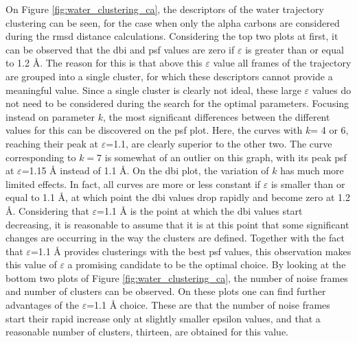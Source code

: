 On Figure \ref{fig:water_clustering_ca}, the descriptors of the water trajectory clustering can be seen, for the case when only the alpha carbons are considered during the \gls{rmsd} distance calculations.
Considering the top two plots at first, it can be observed that the \gls{dbi} and \gls{psf} values are zero if $\varepsilon$ is greater than or equal to 1.2 \AA{}.
The reason for this is that above this $\varepsilon$ value all frames of the trajectory are grouped into a single cluster, for which these descriptors cannot provide a meaningful value.
Since a single cluster is clearly not ideal, these large $\varepsilon$ values do not need to be considered during the search for the optimal parameters.
Focusing instead on parameter $k$, the most significant differences between the different values for this can be discovered on the \gls{psf} plot.
Here, the curves with $k$= 4 or 6, reaching their peak at $\varepsilon$=1.1, are clearly superior to the other two.
The curve corresponding to $k=7$ is somewhat of an outlier on this graph, with its peak \gls{psf} at $\varepsilon$=1.15 \AA{} instead of 1.1 \AA{}.
On the \gls{dbi} plot, the variation of $k$ has much more limited effects.
In fact, all curves are more or less constant if $\varepsilon$ is smaller than or equal to 1.1 \AA{}, at which point the \gls{dbi} values drop rapidly and become zero at 1.2 \AA{}.
Considering that $\varepsilon$=1.1 \AA{} is the point at which the \gls{dbi} values start decreasing, it is reasonable to assume that it is at this point that some significant changes are occurring in the way the clusters are defined.
Together with the fact that $\varepsilon$=1.1 \AA{} provides clusterings with the best \gls{psf} values, this observation makes this value of $\varepsilon$ a promising candidate to be the optimal choice.
By looking at the bottom two plots of Figure \ref{fig:water_clustering_ca}, the number of noise frames and number of clusters can be observed.
On these plots one can find further advantages of the $\varepsilon$=1.1 \AA{} choice.
These are that the number of noise frames start their rapid increase only at slightly smaller epsilon values, and that a reasonable number of clusters, thirteen, are obtained for this value.

